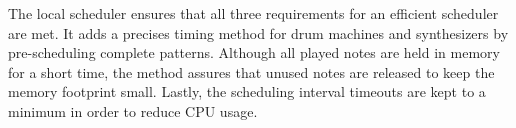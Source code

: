 The local scheduler ensures that all three requirements for an efficient scheduler are met. It adds a precises timing method for drum machines and synthesizers by pre-scheduling complete patterns. Although all played notes are held in memory for a short time, the  method assures that unused notes are released to keep the memory footprint small. Lastly, the scheduling interval timeouts are kept to a minimum in order to reduce CPU usage.

